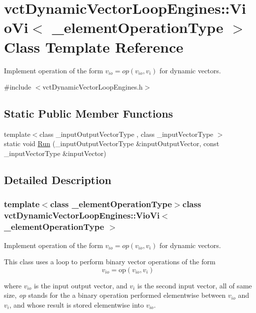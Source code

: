 \hypertarget{classvct_dynamic_vector_loop_engines_1_1_vio_vi}{}\section{vct\+Dynamic\+Vector\+Loop\+Engines\+:\+:Vio\+Vi$<$ \+\_\+element\+Operation\+Type $>$ Class Template Reference}
\label{classvct_dynamic_vector_loop_engines_1_1_vio_vi}


Implement operation of the form $v_{io} = op(v_{io}, v_i)$ for dynamic vectors.  




{\ttfamily \#include $<$vct\+Dynamic\+Vector\+Loop\+Engines.\+h$>$}

\subsection*{Static Public Member Functions}
\begin{DoxyCompactItemize}
\item 
{\footnotesize template$<$class \+\_\+input\+Output\+Vector\+Type , class \+\_\+input\+Vector\+Type $>$ }\\static void \hyperlink{classvct_dynamic_vector_loop_engines_1_1_vio_vi_ae0a793b8eb6981b09ec9257a2bd144f9}{Run} (\+\_\+input\+Output\+Vector\+Type \&input\+Output\+Vector, const \+\_\+input\+Vector\+Type \&input\+Vector)
\end{DoxyCompactItemize}


\subsection{Detailed Description}
\subsubsection*{template$<$class \+\_\+element\+Operation\+Type$>$class vct\+Dynamic\+Vector\+Loop\+Engines\+::\+Vio\+Vi$<$ \+\_\+element\+Operation\+Type $>$}

Implement operation of the form $v_{io} = op(v_{io}, v_i)$ for dynamic vectors. 

This class uses a loop to perform binary vector operations of the form \[ v_{io} = \mathrm{op}(v_{io}, v_{i}) \]

where $v_{io}$ is the input output vector, and $v_{i}$ is the second input vector, all of same size, {\itshape op} stands for the a binary operation performed elementwise between $v_{io}$ and $v_{i}$, and whose result is stored elementwise into $v_{io}$.


